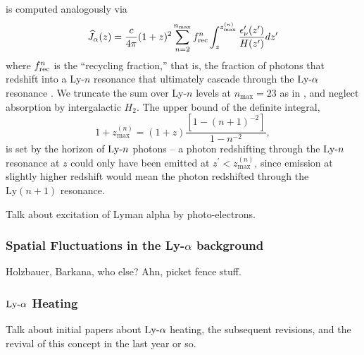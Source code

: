 is computed analogously via
\begin{equation}
    \widehat{J}_{\alpha}(z) = \frac{c}{4\pi} (1 + z)^2 \sum_{n = 2}^{n_{\text{max}}} f_{\text{rec}}^{n} \int_z^{z_{\max}^{(n)}} \frac{\epsilon_{\nu}^{\prime}(z^{\prime})}{H(z^{\prime})} dz^{\prime} \label{eq:LymanAlphaFlux}
\end{equation}
where $f_{\text{rec}}^{n}$ is the ``recycling fraction,'' that is, the fraction of photons that redshift into a Ly-$n$ resonance that ultimately cascade through the $\text{Ly-}\alpha$ resonance \cite{Pritchard2006}. We truncate the sum over Ly-$n$ levels at $n_{\max}=23$ as in \cite{Barkana2005}, and neglect absorption by intergalactic $H_2$. The upper bound of the definite integral,
\begin{equation}
    1 + z_{\max}^{(n)} = (1 + z) \frac{\left[1 - (n + 1)^{-2}\right]}{1 - n^{-2}} ,
\end{equation}
is set by the horizon of $\text{Ly-}n$ photons -- a photon redshifting through the  $\text{Ly-}n$ resonance at $z$ could only have been emitted at $z^{\prime} < z_{\max}^{(n)}$, since emission at slightly higher redshift would mean the photon redshifted through the $\text{Ly}(n+1)$ resonance.


Talk about excitation of Lyman alpha by photo-electrons.

\subsubsection{Spatial Fluctuations in the Ly-$\alpha$ background} 
Holzbauer, Barkana, who else? Ahn, picket fence stuff.





\subsubsection{$\text{Ly-}\alpha$ Heating}
Talk about initial papers about $\text{Ly-}\alpha$ heating, the subsequent revisions, and the revival of this concept in the last year or so.



